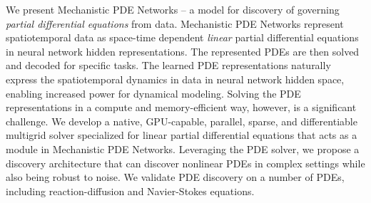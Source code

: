 We present Mechanistic PDE Networks -- a model for discovery of governing \emph{partial differential equations} from data.
Mechanistic PDE Networks represent spatiotemporal data as space-time dependent \emph{linear} partial differential equations in neural network hidden representations. 
The represented PDEs are then solved and decoded for specific tasks.
The learned PDE representations naturally express the spatiotemporal dynamics in data in neural network hidden space, enabling increased power for dynamical modeling.
Solving the PDE representations in a compute and memory-efficient way, however, is a significant challenge.
We develop a native, GPU-capable, parallel, sparse, and differentiable multigrid solver specialized for linear partial differential equations that acts as a module in Mechanistic PDE Networks.
Leveraging the PDE solver, we propose a discovery architecture that can discover nonlinear PDEs in complex settings while also being robust to noise.
We validate PDE discovery on a number of PDEs, including reaction-diffusion and Navier-Stokes equations.

